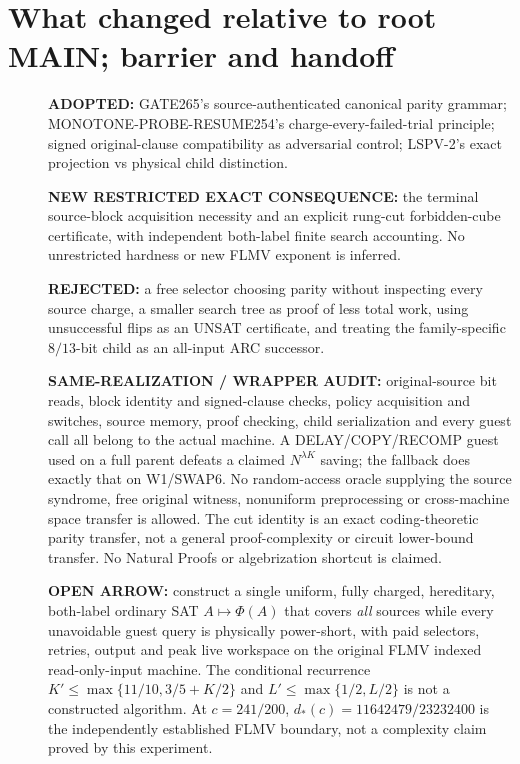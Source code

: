 \documentclass[11pt]{article}
\begin{document}
\section{What changed relative to root MAIN; barrier and handoff}
\begin{description}
\item[]\textbf{ADOPTED:} GATE265's source-authenticated canonical parity grammar; MONOTONE-PROBE-RESUME254's charge-every-failed-trial principle; signed original-clause compatibility as adversarial control; LSPV-2's exact projection vs physical child distinction.
\item[]\textbf{NEW RESTRICTED EXACT CONSEQUENCE:} the terminal source-block acquisition necessity and an explicit rung-cut forbidden-cube certificate, with independent both-label finite search accounting. No unrestricted hardness or new FLMV exponent is inferred.
\item[]\textbf{REJECTED:} a free selector choosing parity without inspecting every source charge, a smaller search tree as proof of less total work, using unsuccessful flips as an UNSAT certificate, and treating the family-specific $8/13$-bit child as an all-input ARC successor.
\item[]\textbf{SAME-REALIZATION / WRAPPER AUDIT:} original-source bit reads, block identity and signed-clause checks, policy acquisition and switches, source memory, proof checking, child serialization and every guest call all belong to the actual machine. A DELAY/COPY/RECOMP guest used on a full parent defeats a claimed $N^{\lambda K}$ saving; the fallback does exactly that on W1/SWAP6. No random-access oracle supplying the source syndrome, free original witness, nonuniform preprocessing or cross-machine space transfer is allowed. The cut identity is an exact coding-theoretic parity transfer, not a general proof-complexity or circuit lower-bound transfer. No Natural Proofs or algebrization shortcut is claimed.
\item[]\textbf{OPEN ARROW:} construct a single uniform, fully charged, hereditary, both-label ordinary SAT $A\mapsto\Phi(A)$ that covers \emph{all} sources while every unavoidable guest query is physically power-short, with paid selectors, retries, output and peak live workspace on the original FLMV indexed read-only-input machine. The conditional recurrence $K'\le\max\{11/10,3/5+K/2\}$ and $L'\le\max\{1/2,L/2\}$ is not a constructed algorithm. At $c=241/200$, $d_*(c)=11642479/23232400$ is the independently established FLMV boundary, not a complexity claim proved by this experiment.
\end{description}
\end{document}

